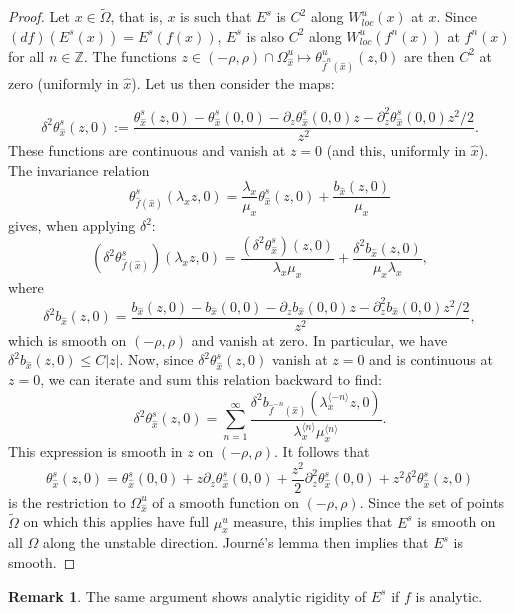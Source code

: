 \documentclass[a4paper]{article}
\theoremstyle{definition}
\newtheorem{remark}[example]{Remark}
\begin{document}
\begin{proof}
Let $x \in \tilde{\Omega}$, that is, $x$ is such that $E^s$ is $C^2$ along $W^u_{loc}(x)$ at $x$. Since $(df)(E^s(x))=E^s(f(x))$, $E^s$ is also $C^2$ along $W^u_{loc}(f^n(x))$ at $f^n(x)$ for all $n \in \mathbb{Z}$. The functions $z \in (-\rho,\rho) \cap \Omega_{\widehat{x}}^u \longmapsto \theta_{\widehat{f}^n(\widehat{x})}^u(z,0)$ are then $C^2$ at zero (uniformly in ${\widehat{x}}$). Let us then consider the maps:

$$ \delta^2 \theta_{\widehat{x}}^s(z,0) := \frac{\theta_{\widehat{x}}^s(z,0)-\theta_{\widehat{x}}^s(0,0)- \partial_z\theta_{\widehat{x}}^s(0,0)z - \partial_z^2 \theta_{\widehat{x}}^s(0,0)z^2/2}{z^2}. $$
These functions are continuous and vanish at $z=0$ (and this, uniformly in ${\widehat{x}}$). The invariance relation
$$ \theta_{\widehat{f}({\widehat{x}})}^s(\lambda_x z,0) = \frac{\lambda_x}{\mu_x} \theta_{{\widehat{x}}}^s(z,0) + \frac{b_{\widehat{x}}(z,0)}{\mu_x}$$
gives, when applying $\delta^2$:
$$ (\delta^2 \theta_{\widehat{f}({\widehat{x}})}^s)(\lambda_x z,0) = \frac{(\delta^2 \theta_{{\widehat{x}}}^s)(z,0)}{\lambda_x \mu_x} + \frac{\delta^2 b_{\widehat{x}}(z,0)}{\mu_x \lambda_x} ,$$
where $$\delta^2 b_{\widehat{x}}(z,0) = \frac{b_{\widehat{x}}(z,0)-b_{\widehat{x}}(0,0)- \partial_z b_{\widehat{x}}(0,0)z - \partial_z^2 b_{\widehat{x}}(0,0)z^2/2}{z^2},$$
which is smooth on $(-\rho,\rho)$ and vanish at zero. In particular, we have $\delta^2 b_{\widehat{x}}(z,0) \leq C|z|$. Now, since $\delta^2 \theta_{\widehat{x}}^s(z,0)$ vanish at $z=0$ and is continuous at $z=0$, we can iterate and sum this relation backward to find:
$$ \delta^2 \theta_{\widehat{x}}^s(z,0) = \sum_{n=1}^\infty \frac{\delta^2 b_{\widehat{f}^{-n}({\widehat{x}})}( \lambda_x^{\langle -n \rangle} z,0)}{\lambda_x^{\langle n \rangle} \mu_x^{\langle n \rangle}} .$$
This expression is smooth in $z$ on $(-\rho,\rho)$. It follows that
$$ \theta_{\widehat{x}}^s(z,0) = \theta_{\widehat{x}}^s(0,0) + z \partial_z\theta_{\widehat{x}}^s(0,0) + \frac{z^2}{2} \partial_z^2\theta_{\widehat{x}}^s(0,0) + z^2 \delta^2 \theta_{\widehat{x}}^s(z,0) $$
is the restriction to $\Omega_{\widehat{x}}^u$ of a smooth function on $(-\rho,\rho)$. 
Since the set of points $\tilde{\Omega}$ on which this applies have full $\mu_x^u$ measure, this implies that $E^s$ is smooth on all $\Omega$ along the unstable direction. Journé's lemma \cite{NT07,Jo88} then implies that $E^s$ is smooth.
\end{proof}

\begin{remark}
The same argument shows analytic rigidity of $E^s$ if $f$ is analytic.
\end{remark}
\end{document}

